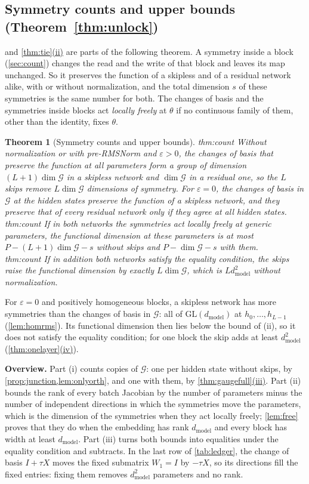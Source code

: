 \documentclass[10pt]{article}
\newtheorem{theorem}{Theorem}[section]
\theoremstyle{definition}
\theoremstyle{remark}
\newcommand{\dm}{d_{\mathrm{model}}}
\newcommand{\GL}{\mathrm{GL}}
\newcommand{\G}{\mathcal{G}}
\newcommand{\para}[1]{\smallskip\noindent\textbf{#1}\hspace{0.5em}}
\newcommand{\ptlabel}[1]{\phantomsection\label{#1}}
\DeclareRobustCommand{\cpref}[2]{\hyperref[#1:#2]{\cref*{#1}(#2)}}
\newcommand{\stpart}[3]{\ifx\relax#1\relax\else\ptlabel{#1:#2}\fi{\upshape\bfseries\boldmath(#2)\ifx\relax#3\relax\else\ #3.\fi}}
\begin{document}
\subsection{Symmetry counts and upper bounds\texorpdfstring{ (Theorem~\ref*{thm:unlock})}{}}\label{app:prf-count}

 and \cpref{thm:tie}{ii} are parts of the following theorem. A symmetry inside a block (\cref{sec:count}) changes the read and the write of that block and leaves its map unchanged. So it preserves the function of a skipless and of a residual network alike, with or without normalization, and the total dimension $s$ of these symmetries is the same number for both. The changes of basis and the symmetries inside blocks act \emph{locally freely} at $\theta$ if no continuous family of them, other than the identity, fixes $\theta$.
\begin{theorem}[Symmetry counts and upper bounds]\label{thm:count}
\stpart{thm:count}{i}{} Without normalization or with pre-RMSNorm and $\varepsilon > 0$, the changes of basis that preserve the function at all parameters form a group of dimension $(L+1)\dim\G$ in a skipless network and $\dim\G$ in a residual one, so the $L$ skips remove $L\dim\G$ dimensions of symmetry. For $\varepsilon = 0$, the changes of basis in $\G$ at the hidden states preserve the function of a skipless network, and they preserve that of every residual network only if they agree at all hidden states.\\
\stpart{thm:count}{ii}{} If in both networks the symmetries act locally freely at generic parameters, the functional dimension at these parameters is at most $P - (L+1)\dim\G - s$ without skips and $P - \dim\G - s$ with them.\\
\stpart{thm:count}{iii}{} If in addition both networks satisfy the equality condition, the skips raise the functional dimension by exactly $L\dim\G$, which is $L\dm^2$ without normalization.
\end{theorem}

For $\varepsilon = 0$ and positively homogeneous blocks, a skipless network has more symmetries than the changes of basis in $\G$: all of $\GL(\dm)$ at $h_0, \dots, h_{L-1}$ (\cref{lem:homrms}). Its functional dimension then lies below the bound of (ii), so it does not satisfy the equality condition; for one block the skip adds at least $\dm^2$ (\cpref{thm:onelayer}{iv}).

\para{Overview.} Part (i) counts copies of $\G$: one per hidden state without skips, by \cref{prop:junction,lem:onlyorth}, and one with them, by \cpref{thm:gaugefull}{iii}. Part (ii) bounds the rank of every batch Jacobian by the number of parameters minus the number of independent directions in which the symmetries move the parameters, which is the dimension of the symmetries when they act locally freely; \cref{lem:free} proves that they do when the embedding has rank $\dm$ and every block has width at least $\dm$. Part (iii) turns both bounds into equalities under the equality condition and subtracts. In the last row of \cref{tab:ledger}, the change of basis $I + \tau X$ moves the fixed submatrix $W_1 = I$ by $-\tau X$, so its directions fill the fixed entries: fixing them removes $\dm^2$ parameters and no rank.
\end{document}
